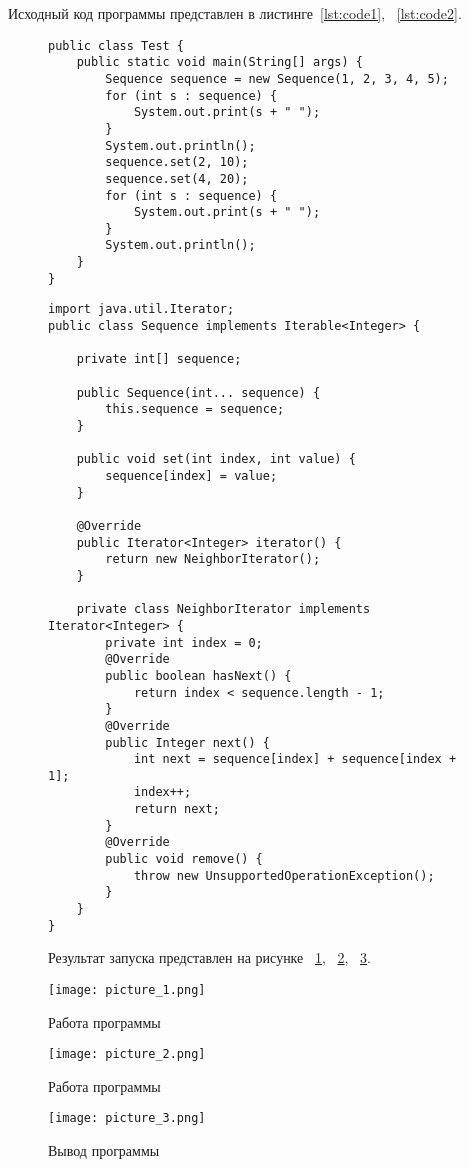 \documentclass[a4paper, 14pt]{extarticle}
\begin{document}
Исходный код программы представлен в листинге~\ref{lst:code1}, ~\ref{lst:code2}.

\begin{figure}[!htb]
\begin{lstlisting}[language={},caption={класс Test},label={lst:code1}]
public class Test {
    public static void main(String[] args) {
        Sequence sequence = new Sequence(1, 2, 3, 4, 5);
        for (int s : sequence) {
            System.out.print(s + " ");
        }
        System.out.println();
        sequence.set(2, 10);
        sequence.set(4, 20);
        for (int s : sequence) {
            System.out.print(s + " ");
        }
        System.out.println();
    }
}
\end{lstlisting}
\end{figure}

\begin{figure}[!htb]
\begin{lstlisting}[language={},caption={класс Sequence},label={lst:code2}]
import java.util.Iterator;
public class Sequence implements Iterable<Integer> {

    private int[] sequence;

    public Sequence(int... sequence) {
        this.sequence = sequence;
    }

    public void set(int index, int value) {
        sequence[index] = value;
    }

    @Override
    public Iterator<Integer> iterator() {
        return new NeighborIterator();
    }

    private class NeighborIterator implements Iterator<Integer> {
        private int index = 0;
        @Override
        public boolean hasNext() {
            return index < sequence.length - 1;
        }
        @Override
        public Integer next() {
            int next = sequence[index] + sequence[index + 1];
            index++;
            return next;
        }
        @Override
        public void remove() {
            throw new UnsupportedOperationException();
        }
    }
}

\end{lstlisting}
\end{figure}

\begin{figure}[!htb]
Результат запуска представлен на рисунке ~\ref{fig:picture_1.png}, ~\ref{fig:picture_2.png}, ~\ref{fig:picture_3.png}.
\end{figure}

\begin{figure}[!htb]
	\centering
	\texttt{[image: picture\_1.png]}
\caption{Работа программы}
\label{fig:picture_1.png}
\end{figure}

\begin{figure}[!htb]
	\centering
	\texttt{[image: picture\_2.png]}
\caption{Работа программы}
\label{fig:picture_2.png}
\end{figure}

\begin{figure}[!htb]
	\centering
	\texttt{[image: picture\_3.png]}
\caption{Вывод программы}
\label{fig:picture_3.png}
\end{figure}
\end{document}
